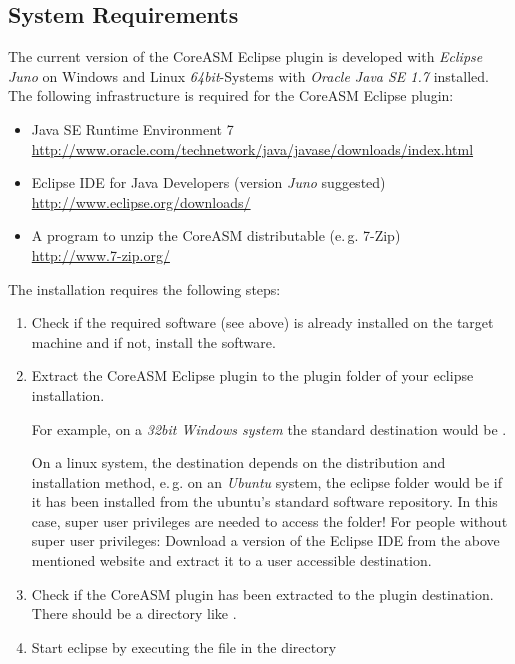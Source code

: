 \documentclass[10pt,oneside,a4paper]{article}
\begin{document}
\subsection{System Requirements}
The current version of the CoreASM Eclipse plugin is developed with \emph{Eclipse Juno} on Windows and Linux \emph{64bit}-Systems with \emph{Oracle Java SE 1.7} installed. The following infrastructure is required for the CoreASM Eclipse plugin:
\begin{itemize}
	\item Java SE Runtime Environment 7\\\url{http://www.oracle.com/technetwork/java/javase/downloads/index.html}
	\item Eclipse IDE for Java Developers (version \emph{Juno} suggested)\\\url{http://www.eclipse.org/downloads/}
	\item A program to unzip the CoreASM distributable (e.\,g. 7-Zip)\\\url{http://www.7-zip.org/}
\end{itemize}
The installation requires the following steps:
\begin{enumerate}
	\item Check if the required software (see above) is already installed on the target machine and if not, install the software.
	\item Extract the CoreASM Eclipse plugin  to the plugin folder of your eclipse installation.

	For example, on a \emph{32bit Windows system} the standard destination would be .

	On a linux system, the destination depends on the distribution and installation method, e.\,g. on an \emph{Ubuntu} system, the eclipse folder would be  if it has been installed from the ubuntu's standard software repository. In this case, super user privileges are needed to access the folder! For people without super user privileges: Download a version of the Eclipse IDE from the above mentioned website and extract it to a user accessible destination.
	\item Check if the CoreASM plugin has been extracted to the plugin destination. There should be a directory like .
	\item Start eclipse by executing the file  in the directory 
\end{enumerate}
\end{document}
